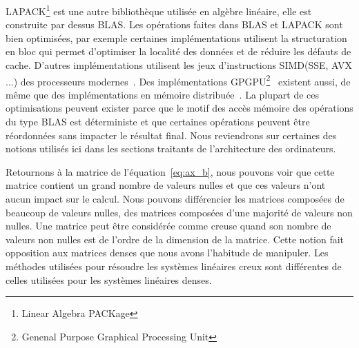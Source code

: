 LAPACK\footnote{Linear Algebra PACKage} est une autre bibliothèque utilisée en algèbre linéaire, elle est construite par dessus BLAS.
%
Les opérations faites dans BLAS et LAPACK sont bien optimisées, par exemple certaines implémentations utilisent la structuration en bloc qui permet d'optimiser la localité des données et de réduire les défauts de cache.
%
D'autres implémentations utilisent les jeux d'instructions SIMD(SSE, AVX ...) des processeurs modernes~\cite{intel_mkl}.
%
Des implémentations GPGPU\footnote{Genenal Purpose Graphical Processing Unit}~\cite{nvidia_cublas} existent aussi, de même que des implémentations en mémoire distribuée~\cite{dplasma}.
%
La plupart de ces optimisations peuvent exister parce que le motif des accès mémoire des opérations du type BLAS est déterministe et que certaines opérations peuvent être réordonnées sans impacter le résultat final.
%
Nous reviendrons sur certaines des notions utilisés ici dans les sections traitants de l'architecture des ordinateurs.


Retournons à la matrice de l'équation~\eqref{eq:ax_b}, nous pouvons voir que cette matrice contient un grand nombre de valeurs nulles et que ces valeurs n'ont aucun impact sur le calcul.
%
Nous pouvons différencier les matrices composées de beaucoup de valeurs nulles, des matrices composées d'une majorité de valeurs non nulles.
%
Une matrice peut être considérée comme creuse quand son nombre de valeurs non nulles est de l'ordre de la dimension de la matrice.
%
Cette notion fait opposition aux matrices denses que nous avons l'habitude de manipuler.
%
Les méthodes utilisées pour résoudre les systèmes linéaires creux sont différentes de celles utilisées pour les systèmes linéaires denses.
